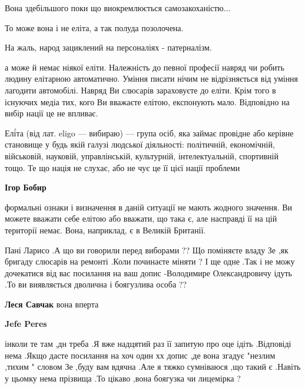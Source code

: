 \begin{itemize}
Вона здебільшого поки що виокремлюється самозакоханістю...

То може вона і не еліта, а так полуда позолочена.

На жаль, народ зациклений на персоналіях - патерналізм.


а може й немає ніякої еліти. Належність до певної професії навряд чи робить
людину елітарною автоматично. Уміння писати нічим не відрізняється від уміння
лагодити автомобілі. Навряд Ви слюсарів зараховуєте до еліти. Крім того в
існуючих медіа тих, кого Ви вважаєте елітою, експонують мало. Відповідно на
вибір нації це не впливає.

\begin{itemize} %

Елі́та (від лат. eligo — вибираю) — група осіб, яка займає провідне або керівне
становище у будь якій галузі людської діяльності: політичній, економічній,
військовій, науковій, управлінській, культурній, інтелектуальній, спортивній
тощо. Те що нація не слухає, або не чує це її цієї нації проблеми

\textbf{Ігор Бобир} 

формальні ознаки і визначення в даній ситуації не мають жодного значення. Ви
можете вважати себе елітою або вважати, що така є, але насправді її на цій
території немає. Вона, наприклад, є в Великій Британії.

\end{itemize} %


Пані Ларисо .А що ви говорили перед виборами ?? Що поміняєте владу Зе ,як
бригаду слюсарів на ремонті .Коли починаєте міняти ? І ще одне .Так і не можу
дочекатися від вас посилання на ваш допис -Володимире Олександровичу ідуть .То
ви виявляється дволична і боягузлива особа ??

\begin{itemize} %
\textbf{Леся Савчак} вона вперта

\textbf{Jefe Peres} 

інколи те там ,дн треба .Я вже надцятий раз її запитую про оце ідіть .Відповіді
нема .Якщо дасте посилання на хоч один хх допис ,де вона згадує "незлим ,тихим
" словом Зе ,буду вам вдячна .Але я тяжко сумніваюся ,що такий є .Навіть у
цьомку нема прізвища .То цікаво ,вона боягузка чи лицемірка ?


\end{itemize}
\end{itemize}
